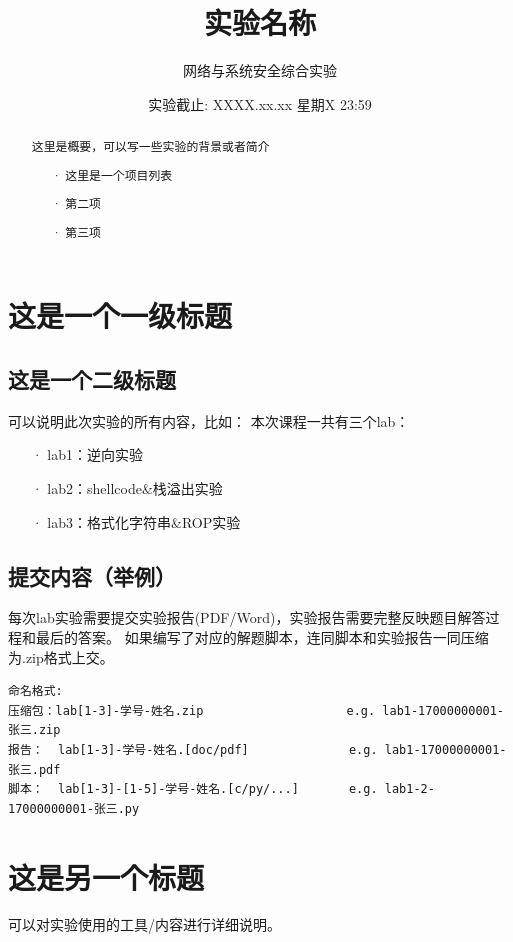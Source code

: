 \documentclass{labart}
\title{实验名称}
\author{网络与系统安全综合实验}
\date{实验截止: XXXX.xx.xx 星期X 23:59}
\begin{document}
\maketitle


\begin{abstract}
这里是概要，可以写一些实验的背景或者简介
\begin{itemize}
\item[·] 这里是一个项目列表
\item[·] 第二项
\item[·] 第三项
\end{itemize}
\end{abstract}


\section{这是一个一级标题}
\subsection{这是一个二级标题}
可以说明此次实验的所有内容，比如：
本次课程一共有三个lab：
\begin{itemize}
\item[·] lab1：逆向实验
\item[·] lab2：shellcode\&栈溢出实验
\item[·] lab3：格式化字符串\&ROP实验
\end{itemize}

\subsection{提交内容（举例）}
每次lab实验需要提交实验报告(PDF/Word)，实验报告需要完整反映题目解答过程和最后的答案。
如果编写了对应的解题脚本，连同脚本和实验报告一同压缩为.zip格式上交。

\begin{lstlisting}[numbers=none,frame=none]
命名格式:
压缩包：lab[1-3]-学号-姓名.zip                    e.g. lab1-17000000001-张三.zip
报告：  lab[1-3]-学号-姓名.[doc/pdf]              e.g. lab1-17000000001-张三.pdf
脚本：  lab[1-3]-[1-5]-学号-姓名.[c/py/...]       e.g. lab1-2-17000000001-张三.py
\end{lstlisting}


\section{这是另一个标题}
可以对实验使用的工具/内容进行详细说明。
\end{document}
